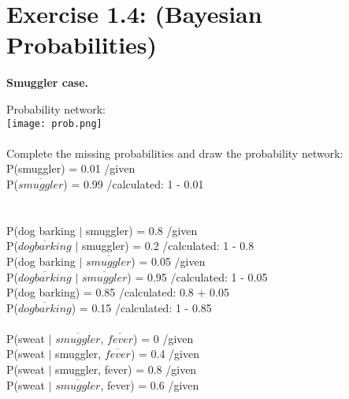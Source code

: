 \documentclass[10pt,a4paper]{article}
\begin{document}
\section*{Exercise 1.4: (Bayesian Probabilities)} 
\textbf{Smuggler case.}

Probability network: \\
\noindent
\texttt{[image: prob.png]} \\ \\

Complete the missing probabilities and draw the probability network: \\ 
P(smuggler) = 0.01 \qquad	/given \\
P($\overline{smuggler}$) = 0.99 \qquad	/calculated: 1 - 0.01 \\
\\
\\
P(dog barking $|$ smuggler) = 0.8 \qquad	/given \\
P($\overline{dog barking}$ $|$ smuggler) = 0.2 \qquad	/calculated: 1 - 0.8 \\
P(dog barking $|$ $\overline{smuggler}$) = 0.05 \qquad	/given \\
P($\overline{dog barking}$ $|$ $\overline{smuggler}$) = 0.95 \qquad	/calculated: 1 - 0.05 \\
P(dog barking) = 0.85 \qquad /calculated: 0.8 + 0.05 \\
P($\overline{dog barking}$) = 0.15 \qquad /calculated: 1 - 0.85 \\
\\
P(sweat $|$ $\overline{smuggler}$, $\overline{fever}$) = 0 \qquad	/given\\
P(sweat $|$ smuggler, $\overline{fever}$) = 0.4 \qquad	/given\\
P(sweat $|$ smuggler, fever) = 0.8 \qquad	/given\\
P(sweat $|$ $\overline{smuggler}$, fever) = 0.6 \qquad	/given\\
\end{document}

